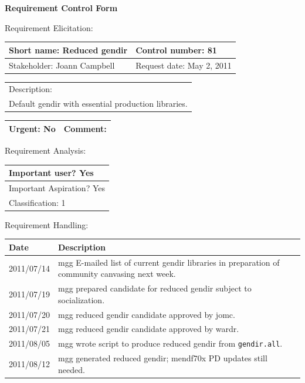 \begin{center}\Large\bf
Requirement Control Form
\end{center}
\vspace{24pt}

Requirement Elicitation:

\begin{tabular}{|p{211pt}|p{211pt}|} \hline
Short name: Reduced gendir & Control number: 81\\ \hline
Stakeholder: Joann Campbell & Request date: May 2, 2011\\
\end{tabular}
\begin{tabular}{|p{433pt}|} \hline
Description: \\ 
Default gendir with essential production libraries.\\
\hline
\end{tabular} 
\begin{tabular}{|p{211pt}|p{211pt}|} \hline
Urgent: No & Comment: \\ \hline
\end{tabular}

\vspace{24pt}

Requirement Analysis:

\begin{tabular}{|p{433pt}|} \hline
Important user? Yes \\ \hline
Important Aspiration? Yes \\ \hline
Classification: 1 \\ \hline
\end{tabular}
\vspace{24pt}

Requirement Handling:

\begin{tabular}{|p{72pt}|p{351pt}|} \hline
Date & Description \\ \hline
2011/07/14 & mgg E-mailed list of current gendir libraries in
preparation of community canvasing next week.\\ \hline 
2011/07/19 & mgg prepared candidate for reduced gendir subject to
socialization. \\ \hline
2011/07/20 & mgg reduced gendir candidate approved by jomc. \\ \hline
2011/07/21 & mgg reduced gendir candidate approved by wardr. \\ \hline
2011/08/05 & mgg wrote script to produce reduced gendir from
\texttt{gendir.all}.\\ \hline
2011/08/12 & mgg generated reduced gendir; mendf70x PD updates still
needed. \\ \hline
\end{tabular}
